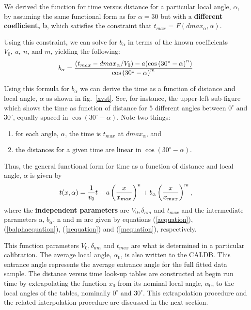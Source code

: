 \documentclass{article}
\begin{document}
We derived the function for time versus distance for a particular local angle, $\alpha$, by
assuming the same functional form as for $\alpha = 30$ but with a {\bf different coefficient, b}, which 
satisfies the constraint that $t_{max}$ = $F(dmax_{\alpha},\alpha)$.

Using this constraint, we can solve for $b_{\alpha}$ in terms of the known coefficients $V_0, ~a, ~n$, and $m$,
yielding the following:
\begin{equation}
\label{balphaequation}
b_{\alpha}={{(t_{max}-dmax_{\alpha}/V_0)-a(\cos \left(30^\circ-\alpha\right)^n)}\over{\cos \left(30^\circ-\alpha\right)^m}}
\end{equation}

Using this formula for $b_{\alpha}$ we can derive the time as a function of distance and local
angle, $\alpha$ as shown in fig.~\ref{xvst}.  See, for instance, the upper-left sub-figure 
which shows the time as function of distance for 5 different angles between $0^{\circ}$ and 
$30^{\circ}$, equally spaced in $\cos \left(30^\circ-\alpha\right)$.  Note two things:
\begin{enumerate}
\item for each angle, $\alpha$, the time is $t_{max}$ at $dmax_{\alpha}$, and
\item the distances for a given time are linear in $\cos \left(30^\circ-\alpha\right)$.
\end{enumerate}

Thus, the general functional form for time as a function of distance and local angle, $\alpha$
is given by
\begin{equation}
\label{tfunctionofxandlocalangle}
t(x,\alpha) = {1 \over v_0} t + a \left( {x \over x_{max}} \right)^n
+ b_\alpha \left( { x \over x_{max}} \right)^m,
\end{equation}
where the {\bf independent parameters} are {\bf $V_0, \delta_{nm}$} and {\bf $t_{max}$} and the intermediate
parameters a, $b_\alpha$, n and m are given by equations (\ref{aequation}), (\ref{balphaequation}), 
(\ref{nequation}) and (\ref{mequation}), respectively.

This function parameters {\bf $V_0, \delta_{nm}$} and {\bf $t_{max}$} are what is determined in a particular calibration.
The average local angle, $\alpha_0$, is also written to the CALDB.  
This entrance
angle represents the average entrance angle for the full fitted data sample.
The distance versus time look-up tables are constructed at begin run
time by extrapolating the function $x_0$ from its
nominal local angle, $\alpha_0$, to the local angles of the tables, 
nominally $0^\circ$ and $30^\circ$.  This extrapolation procedure and the related
interpolation procedure are discussed in the next section.
\end{document}
